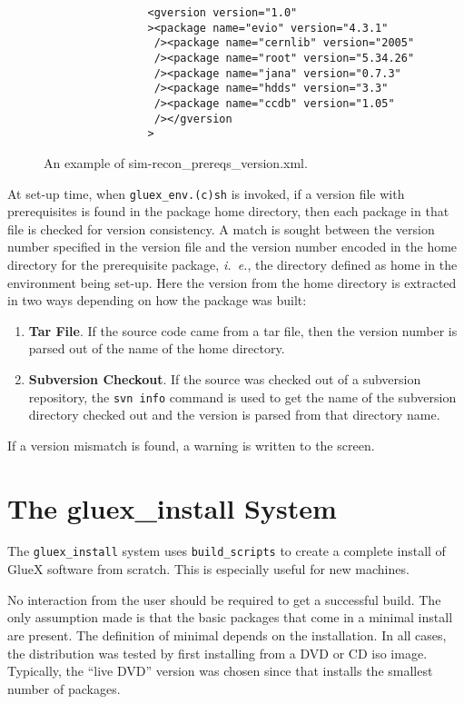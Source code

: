 \documentclass[12pt]{article}
\begin{document}
\begin{figure}
\begin{verbatim}
                <gversion version="1.0"
                ><package name="evio" version="4.3.1"
                 /><package name="cernlib" version="2005"
                 /><package name="root" version="5.34.26"
                 /><package name="jana" version="0.7.3"
                 /><package name="hdds" version="3.3"
                 /><package name="ccdb" version="1.05"
                 /></gversion
                >
\end{verbatim}
\caption{An example of sim-recon\_prereqs\_version.xml.}\label{figure:prereqs-xml-file}
\end{figure}

At set-up time, when {\tt gluex\_env.(c)sh} is invoked, if a version
file with prerequisites is found in the package home directory, then
each package in that file is checked for version consistency. A match
is sought between the version number specified in the version file and
the version number encoded in the home directory for the prerequisite
package, {\it i.~e.}, the directory defined as home in the environment
being set-up. Here the version from the home directory is extracted in
two ways depending on how the package was built:
\begin{enumerate}
\item {\bf Tar File}. If the source code came from a tar file, then the version number is parsed out of the name of the home directory.
\item {\bf Subversion Checkout}. If the source was checked out of a subversion repository, the {\tt svn info} command is used to get the name of the subversion directory checked out and the version is parsed from that directory name.
\end{enumerate}
If a version mismatch is found, a warning is written to the screen.

\section{The gluex\_install System}

The {\tt gluex\_install} system uses {\tt build\_scripts} to create a
complete install of GlueX software from scratch. This is especially
useful for new machines.

No interaction from the user should be required to get a successful
build. The only assumption made is that the basic packages that come
in a minimal install are present. The definition of minimal
depends on the installation. In all cases, the distribution was tested
by first installing from a DVD or CD iso image. Typically, the ``live
DVD'' version was chosen since that installs the smallest number of
packages.
\end{document}
